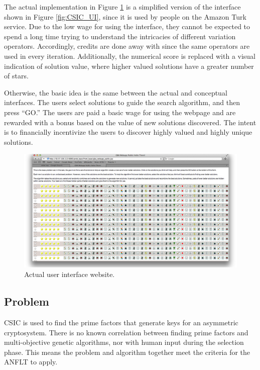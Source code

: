 The actual implementation in Figure \ref{fig:website_UI} is a simplified version of the interface shown in Figure \ref{fig:CSIC_UI}, since it is used by people on the Amazon Turk service.  Due to the low wage for using the interface, they cannot be expected to spend a long time trying to understand the intricacies of different variation operators.  Accordingly, credits are done away with since the same operators are used in every iteration.  Additionally, the numerical score is replaced with a visual indication of solution value, where higher valued solutions have a greater number of stars.

Otherwise, the basic idea is the same between the actual and conceptual interfaces.  The users select solutions to guide the search algorithm, and then press ``GO.''  The users are paid a basic wage for using the webpage and are rewarded with a bonus based on the value of new solutions discovered.  The intent is to financially incentivize the users to discover highly valued and highly unique solutions. 

\begin{figure}[!t]
  \centering
  \includegraphics[width=4.5in]{HollowayWebsiteUI}
  \caption{Actual user interface website.}
  \label{fig:website_UI}
\end{figure}

\subsection{Problem}\label{sec:problem}

CSIC is used to find the prime factors that generate keys for an asymmetric cryptosystem.  There is no known correlation between finding prime factors and multi-objective genetic algorithms, nor with human input during the selection phase.  This means the problem and algorithm together meet the criteria for the ANFLT to apply. 

